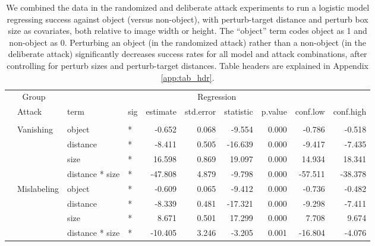 \documentclass[
]{article}
\begin{document}
\begin{longtable}[t]{llllrrrrrr}
\caption{\label{tab:rand_arb_compare_table}We combined the data in the randomized and deliberate attack experiments to run a logistic model regressing success against object (versus non-object), with perturb-target distance and perturb box size as covariates, both relative to image width or height. The ``object'' term codes object as 1 and non-object as 0. Perturbing an object (in the randomized attack) rather than a non-object (in the deliberate attack) significantly decreases success rates for all model and attack combinations, after controlling for perturb sizes and perturb-target distances. Table headers are explained in Appendix \ref{app:tab_hdr}.}\\
\toprule
\multicolumn{2}{c}{Group} & \multicolumn{8}{c}{Regression} \\
\cmidrule(l{3pt}r{3pt}){1-2} \cmidrule(l{3pt}r{3pt}){3-10}
 & Attack & term & sig & estimate & std.error & statistic & p.value & conf.low & conf.high\\
\midrule
\addlinespace[0.3em]
\multicolumn{10}{l}{\textbf{YOLOv3}}\\
\hspace{1em} & Vanishing & object & * & -0.652 & 0.068 & -9.554 & 0.000 & -0.786 & -0.518\\
\cmidrule{3-10}\nopagebreak
\hspace{1em} &  & distance & * & -8.411 & 0.505 & -16.639 & 0.000 & -9.417 & -7.435\\
\cmidrule{3-10}\nopagebreak
\hspace{1em} &  & size & * & 16.598 & 0.869 & 19.097 & 0.000 & 14.934 & 18.341\\
\cmidrule{3-10}\nopagebreak
\hspace{1em} &  & distance * size & * & -47.808 & 4.879 & -9.798 & 0.000 & -57.511 & -38.378\\
\cmidrule{2-10}\nopagebreak
\hspace{1em} & Mislabeling & object & * & -0.609 & 0.065 & -9.412 & 0.000 & -0.736 & -0.482\\
\cmidrule{3-10}\nopagebreak
\hspace{1em} &  & distance & * & -8.339 & 0.481 & -17.321 & 0.000 & -9.298 & -7.411\\
\cmidrule{3-10}\nopagebreak
\hspace{1em} &  & size & * & 8.671 & 0.501 & 17.299 & 0.000 & 7.708 & 9.674\\
\cmidrule{3-10}\nopagebreak
\hspace{1em} &  & distance * size & * & -10.405 & 3.246 & -3.205 & 0.001 & -16.804 & -4.076\\

\end{longtable}
\end{document}
